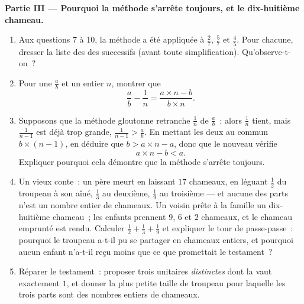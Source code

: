 \begin{problem}
\medskip
\noindent\textbf{Partie III --- Pourquoi la méthode s'arrête
toujours, et le dix-huitième chameau.}
\begin{enumerate}[resume]
  \item Aux questions 7 à 10, la méthode a été appliquée à
        $\frac27$, $\frac57$ et $\frac45$. Pour chacune, dresser la
        liste des  des  successifs (avant toute
        simplification). Qu'observe-t-on~?
  \item Pour une  $\frac ab$ et un entier $n$, montrer que
        \[
        \frac{a}{b} - \frac{1}{n}
        = \frac{a \times n - b}{b \times n} .
        \]
  \item Supposons que la méthode gloutonne retranche $\frac1n$ de
        $\frac ab$~: alors $\frac1n$ tient, mais $\frac{1}{n-1}$ est
        déjà trop grande, $\frac{1}{n-1} > \frac ab$. En mettant les
        deux au  commun $b \times (n - 1)$, en déduire
        que $b > a \times n - a$, donc que le nouveau 
        vérifie
        \[
        a \times n - b < a .
        \]
        Expliquer pourquoi cela démontre que la méthode s'arrête
        toujours.
  \item Un vieux conte~: un père meurt en laissant $17$ chameaux, en
        léguant $\frac12$ du troupeau à son aîné, $\frac13$ au
        deuxième, $\frac19$ au troisième --- et aucune des parts
        n'est un nombre entier de chameaux. Un voisin prête à la
        famille un dix-huitième chameau~; les enfants prennent $9$,
        $6$ et $2$ chameaux, et le chameau emprunté est rendu.
        Calculer $\frac12 + \frac13 + \frac19$ et expliquer le tour
        de passe-passe~: pourquoi le troupeau a-t-il pu se partager
        en chameaux entiers, et pourquoi aucun enfant n'a-t-il reçu
        moins que ce que promettait le testament~?
  \item Réparer le testament~: proposer trois  unitaires
        \emph{distinctes} dont la  vaut exactement $1$, et
        donner la plus petite taille de troupeau pour laquelle les
        trois parts sont des nombres entiers de chameaux.
\end{enumerate}
\end{problem}
